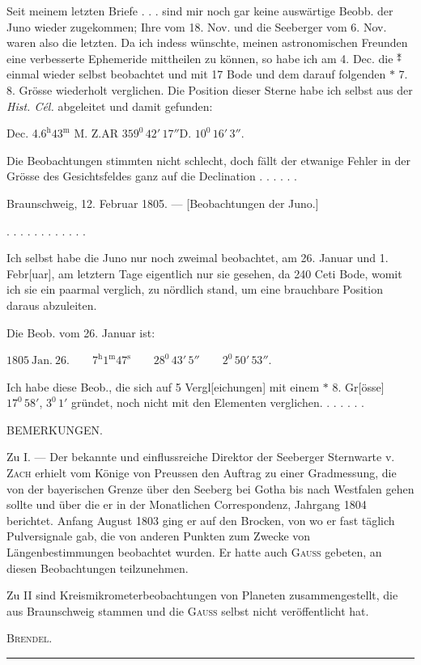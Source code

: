 \noindent\hspace*{\parindent}Seit meinem letzten Briefe . . . sind mir noch gar keine auswärtige Beobb. der Juno wieder zugekommen; Ihre vom 18. Nov. und die Seeberger vom 6. Nov. waren also die letzten. Da ich indess wünschte, meinen astronomischen Freunden eine verbesserte Ephemeride mittheilen zu können, so habe ich
\HistoricalFoot{}{34\textsuperscript{*}}
\clearpage{}
\noindent am 4. Dec. die $\BJuno$ einmal wieder selbst beobachtet und mit 17 Bode und dem darauf folgenden $\ast$ 7. 8. Grösse wiederholt verglichen. Die Position dieser Sterne habe ich selbst aus der \textit{Hist. Cél.} abgeleitet und damit gefunden:
\begin{center}\small
Dec. 4.\quad $6^{\mathrm h}43^{\mathrm m}$ M. Z.\quad AR $359^0\,42'\,17''$\quad D. $10^0\,16'\,3''$.
\end{center}
\noindent Die Beobachtungen stimmten nicht schlecht, doch fällt der etwanige Fehler in der Grösse des Gesichtsfeldes ganz auf die Declination . . . . . .
\begin{center}Braunschweig, 12. Februar 1805. — [Beobachtungen der Juno.]\end{center}
\noindent . . . . . . . . . . . .\par
\noindent\hspace*{\parindent}Ich selbst habe die Juno nur noch zweimal beobachtet, am 26. Januar und 1. Febr[uar], am letztern Tage eigentlich nur sie gesehen, da 240 Ceti Bode, womit ich sie ein paarmal verglich, zu nördlich stand, um eine brauchbare Position daraus abzuleiten.

Die Beob. vom 26. Januar ist:
\begin{center}$1805\ \text{Jan.}\ 26.\qquad 7^{\mathrm h}1^{\mathrm m}47^{\mathrm s}\qquad 28^0\,43'\,5''\qquad 2^0\,50'\,53''.$\end{center}
\noindent Ich habe diese Beob., die sich auf 5 Vergl[eichungen] mit einem $\ast$ 8. Gr[össe] $17^0\,58'$, $3^0\,1'$ gründet, noch nicht mit den Elementen verglichen. . . . . . .
\begin{center}\small BEMERKUNGEN.\end{center}
\begingroup\small
\noindent\hspace*{\parindent}Zu I. — Der bekannte und einflussreiche Direktor der Seeberger Sternwarte v. \textsc{Zach} erhielt vom Könige von Preussen den Auftrag zu einer Gradmessung, die von der bayerischen Grenze über den Seeberg bei Gotha bis nach Westfalen gehen sollte und über die er in der Monatlichen Correspondenz, Jahrgang 1804 berichtet. Anfang August 1803 ging er auf den Brocken, von wo er fast täglich Pulversignale gab, die von anderen Punkten zum Zwecke von Längenbestimmungen beobachtet wurden. Er hatte auch \textsc{Gauss} gebeten, an diesen Beobachtungen teilzunehmen.

Zu II sind Kreismikrometerbeobachtungen von Planeten zusammengestellt, die aus Braunschweig stammen und die \textsc{Gauss} selbst nicht veröffentlicht hat.
\begin{flushright}\textsc{Brendel}.\end{flushright}
\endgroup
\begin{center}\rule{.24\linewidth}{.5pt}\end{center}
\clearpage\endgroup
